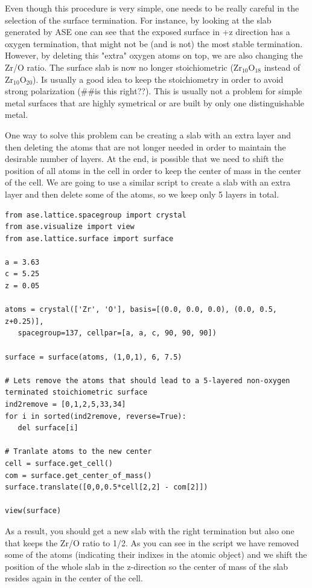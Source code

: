\documentclass[11pt]{article}
\begin{document}
Even though this procedure is very simple, one needs to be really careful in the selection of the surface termination. For instance, by looking at the slab generated by ASE one can see that the exposed surface in +z direction has a oxygen termination, that might not be (and is not) the most stable termination. However, by deleting this "extra" oxygen atoms on top, we are also changing the Zr/O ratio. The surface slab is now no longer stoichiometric (Zr$_{\text{10}}$O$_{\text{18}}$ instead of Zr$_{\text{10}}$O$_{\text{20}}$). Is usually a good idea to keep the stoichiometry in order to avoid strong polarization (\#\#is this right??). This is usually not a problem for simple metal surfaces that are highly symetrical or are built by only one distinguishable metal.

One way to solve this problem can be creating a slab with an extra layer and then deleting the atoms that are not longer needed in order to maintain the desirable number of layers. At the end, is possible that we need to shift the position of all atoms in the cell in order to keep the center of mass in the center of the cell. We are going to use a similar script to create a slab with an extra layer and then delete some of the atoms, so we keep only 5 layers in total.

\begin{verbatim}
from ase.lattice.spacegroup import crystal
from ase.visualize import view
from ase.lattice.surface import surface

a = 3.63
c = 5.25
z = 0.05

atoms = crystal(['Zr', 'O'], basis=[(0.0, 0.0, 0.0), (0.0, 0.5, z+0.25)],
   spacegroup=137, cellpar=[a, a, c, 90, 90, 90])

surface = surface(atoms, (1,0,1), 6, 7.5)

# Lets remove the atoms that should lead to a 5-layered non-oxygen terminated stoichiometric surface
ind2remove = [0,1,2,5,33,34]
for i in sorted(ind2remove, reverse=True):
   del surface[i]

# Tranlate atoms to the new center
cell = surface.get_cell()
com = surface.get_center_of_mass()
surface.translate([0,0,0.5*cell[2,2] - com[2]])

view(surface)
\end{verbatim}

As a result, you should get a new slab with the right termination but also one that keeps the Zr/O ratio to 1/2. As you can see in the script we have removed some of the atoms (indicating their indixes in the atomic object) and we shift the position of the whole slab in the z-direction so the center of mass of the slab resides again in the center of the cell.
\end{document}
